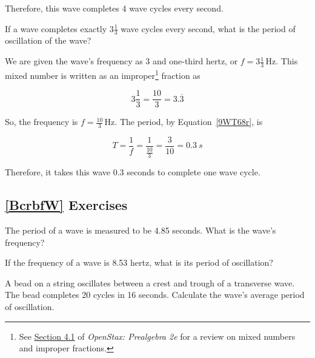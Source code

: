\documentclass[main.tex]{subfiles}
\begin{document}
Therefore, this wave completes 4 wave cycles every second.

\solutionEnd

\begin{example}
    If a wave completes exactly $3 \frac{1}{3}$ wave cycles every second, what is the period of oscillation of the wave? 
\end{example}

\Solution We are given the wave's frequency as 3 and one-third hertz, or $f = 3\frac{1}{3}\,\text{Hz}$. This mixed number is written as an improper\footnote{See \href{https://openstax.org/books/prealgebra-2e/pages/4-1-visualize-fractions}{Section 4.1} of \textit{OpenStax: Prealgebra 2e} for a review on mixed numbers and improper fractions.} fraction as

\begin{equation*}
    3 \frac{1}{3} = \frac{10}{3} = 3.\overline{3}
\end{equation*}

So, the frequency is $f = \frac{10}{3}\,\text{Hz}$. The period, by Equation~\eqref{9WT68r}, is

\begin{equation*}
    T = \frac{1}{f} = \frac{1}{\frac{10}{3}} = \frac{3}{10}  = \SI{0.3}{s}
\end{equation*}

Therefore, it takes this wave 0.3 seconds to complete one wave cycle. 

\solutionEnd

\subsection*{\ref{BcrbfW} Exercises}

\begin{exercise} \label{XGViXs}
    The period of a wave is measured to be 4.85 seconds. What is the wave's frequency?
\end{exercise} 

\begin{exercise} \label{EeHAB4} 
    If the frequency of a wave is 8.53 hertz, what is its period of oscillation?
\end{exercise}

\begin{exercise} \label{ldTSm3} 
    A bead on a string oscillates between a crest and trough of a transverse wave. The bead completes 20 cycles in 16 seconds. Calculate the wave's average period of oscillation. 
\end{exercise}
\end{document}
